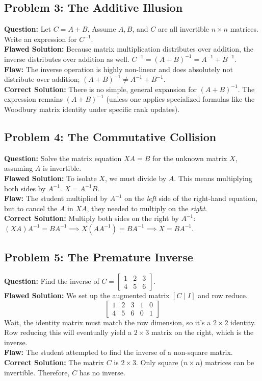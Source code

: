 \documentclass[11pt]{article}
\begin{document}
\subsection{Problem 3: The Additive Illusion}
\textbf{Question:} Let $C = A + B$. Assume $A, B$, and $C$ are all invertible $n \times n$ matrices. Write an expression for $C^{-1}$.
\\
\textbf{Flawed Solution:}
Because matrix multiplication distributes over addition, the inverse distributes over addition as well.
$C^{-1} = (A + B)^{-1} = A^{-1} + B^{-1}$.
\\
\textbf{Flaw:} The inverse operation is highly non-linear and does absolutely not distribute over addition; $(A+B)^{-1} \neq A^{-1} + B^{-1}$.
\\
\textbf{Correct Solution:}
There is no simple, general expansion for $(A+B)^{-1}$. The expression remains $(A+B)^{-1}$ (unless one applies specialized formulas like the Woodbury matrix identity under specific rank updates).

\subsection{Problem 4: The Commutative Collision}
\textbf{Question:} Solve the matrix equation $XA = B$ for the unknown matrix $X$, assuming $A$ is invertible.
\\
\textbf{Flawed Solution:}
To isolate $X$, we must divide by $A$. This means multiplying both sides by $A^{-1}$.
$X = A^{-1}B$.
\\
\textbf{Flaw:} The student multiplied by $A^{-1}$ on the \textit{left} side of the right-hand equation, but to cancel the $A$ in $XA$, they needed to multiply on the \textit{right}.
\\
\textbf{Correct Solution:}
Multiply both sides on the right by $A^{-1}$:
$(XA)A^{-1} = BA^{-1} \implies X(AA^{-1}) = BA^{-1} \implies X = BA^{-1}$.

\subsection{Problem 5: The Premature Inverse}
\textbf{Question:} Find the inverse of $C = \begin{bmatrix} 1 & 2 & 3 \\ 4 & 5 & 6 \end{bmatrix}$.
\\
\textbf{Flawed Solution:}
We set up the augmented matrix $[C \mid I]$ and row reduce.
\[ \left[ \begin{array}{ccc|cc} 1 & 2 & 3 & 1 & 0 \\ 4 & 5 & 6 & 0 & 1 \end{array} \right] \]
Wait, the identity matrix must match the row dimension, so it's a $2 \times 2$ identity. Row reducing this will eventually yield a $2 \times 3$ matrix on the right, which is the inverse.
\\
\textbf{Flaw:} The student attempted to find the inverse of a non-square matrix.
\\
\textbf{Correct Solution:}
The matrix $C$ is $2 \times 3$. Only square ($n \times n$) matrices can be invertible. Therefore, $C$ has no inverse.
\end{document}
